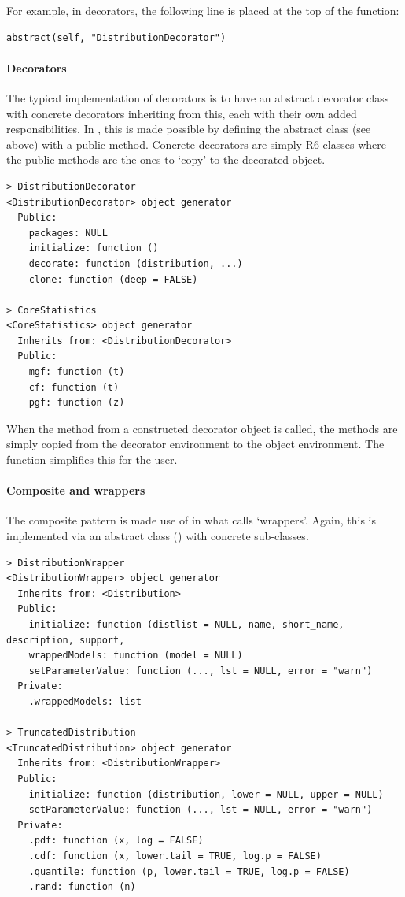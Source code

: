 For example, in decorators, the following line is placed at the top of the  function:

\begin{verbatim}
abstract(self, "DistributionDecorator")
\end{verbatim}

\paragraph{Decorators}
The typical implementation of decorators is to have an abstract decorator class with concrete decorators inheriting from this, each with their own added responsibilities. In , this is made possible by defining the  abstract class (see above) with a public  method. Concrete decorators are simply R6 classes where the public methods are the ones to `copy' to the decorated object.

\begin{verbatim}
> DistributionDecorator
<DistributionDecorator> object generator
  Public:
    packages: NULL
    initialize: function ()
    decorate: function (distribution, ...)
    clone: function (deep = FALSE)

> CoreStatistics
<CoreStatistics> object generator
  Inherits from: <DistributionDecorator>
  Public:
    mgf: function (t)
    cf: function (t)
    pgf: function (z)
\end{verbatim}

When the  method from a constructed decorator object is called, the methods are simply copied from the decorator environment to the object environment. The  function simplifies this for the user.

\paragraph{Composite and wrappers}
The composite pattern is made use of in what  calls `wrappers'. Again, this is implemented via an abstract class () with concrete sub-classes.

\begin{verbatim}
> DistributionWrapper
<DistributionWrapper> object generator
  Inherits from: <Distribution>
  Public:
    initialize: function (distlist = NULL, name, short_name, description, support,
    wrappedModels: function (model = NULL)
    setParameterValue: function (..., lst = NULL, error = "warn")
  Private:
    .wrappedModels: list

> TruncatedDistribution
<TruncatedDistribution> object generator
  Inherits from: <DistributionWrapper>
  Public:
    initialize: function (distribution, lower = NULL, upper = NULL)
    setParameterValue: function (..., lst = NULL, error = "warn")
  Private:
    .pdf: function (x, log = FALSE)
    .cdf: function (x, lower.tail = TRUE, log.p = FALSE)
    .quantile: function (p, lower.tail = TRUE, log.p = FALSE)
    .rand: function (n)
\end{verbatim}

